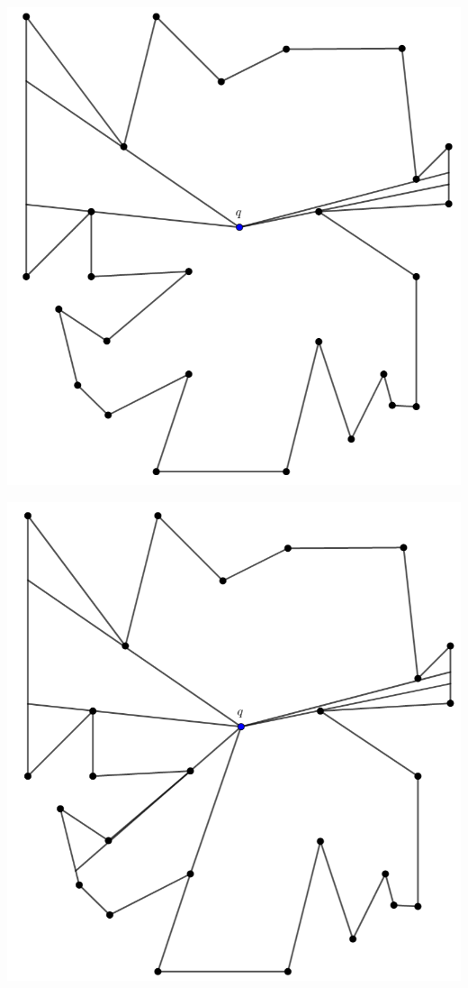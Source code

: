 {\begin{frame}
  \centering \includegraphics[width=0.55 \paperwidth]{images/V(q)07.png}
\end{frame}

\begin{frame}
  \centering \includegraphics[width=0.55 \paperwidth]{images/V(q)08.png}
\end{frame}

}
